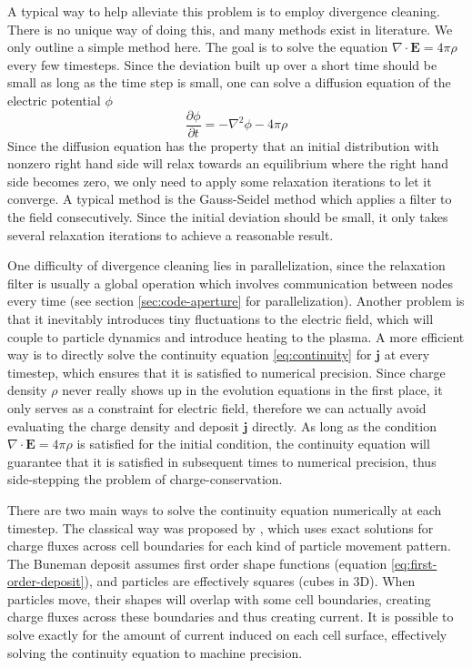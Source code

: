 A typical way to help alleviate this problem is to employ divergence
cleaning. There is no unique way of doing this, and many methods exist in
literature.  %
We only outline a simple method here. The goal is to solve the equation
$\nabla\cdot \mathbf{E} = 4\pi\rho$ every few timesteps. Since the deviation
built up over a short time should be small as long as the time step is small,
one can solve a diffusion equation of the electric potential $\phi$
\begin{equation}
  \label{eq:diffusion-electric-potential}
  \frac{\partial\phi}{\partial t} = -\nabla^2\phi - 4\pi\rho
\end{equation}
Since the diffusion equation has the property that an initial distribution with
nonzero right hand side will relax towards an equilibrium where the right hand
side becomes zero, we only need to apply some relaxation iterations to let it
converge. A typical method is the Gauss-Seidel method \citep[see
e.g.][]{press_numerical_2007} which applies a filter to the field consecutively.
Since the initial deviation should be small, it only takes several relaxation
iterations to achieve a reasonable result.

One difficulty of divergence cleaning lies in parallelization, since the
relaxation filter is usually a global operation which involves communication
between nodes every time (see section \ref{sec:code-aperture} for
parallelization). Another problem is that it inevitably introduces tiny
fluctuations to the electric field, which will couple to particle dynamics and
introduce heating to the plasma. A more efficient way is to directly solve the
continuity equation \eqref{eq:continuity} for $\mathbf{j}$ at every timestep,
which ensures that it is satisfied to numerical precision. Since charge density
$\rho$ never really shows up in the evolution equations in the first place, it
only serves as a constraint for electric field, therefore we can actually avoid
evaluating the charge density and deposit $\mathbf{j}$ directly. As long as the
condition $\nabla\cdot \mathbf{E} = 4\pi\rho$ is satisfied for the initial
condition, the continuity equation will guarantee that it is satisfied in
subsequent times to numerical precision, thus side-stepping the problem of
charge-conservation.

There are two main ways to solve the continuity equation numerically at each
timestep. The classical way was proposed by \citet{villasenor_rigorous_1992},
which uses exact solutions for charge fluxes across cell boundaries for each
kind of particle movement pattern. The Buneman deposit assumes first order shape
functions (equation \eqref{eq:first-order-deposit}), and particles are effectively
squares (cubes in 3D). When particles move, their shapes will overlap with some
cell boundaries, creating charge fluxes across these boundaries and thus
creating current. It is possible to solve exactly for the amount of current
induced on each cell surface, effectively solving the continuity equation to
machine precision.

